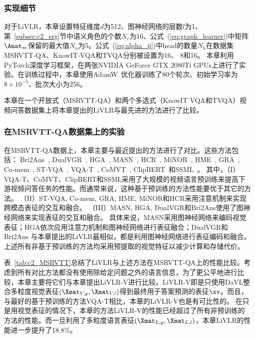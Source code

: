 \subsubsection{实现细节}
对于LiVLR，本章设置特征维度$d$为512、图神经网络的层数$l$为1、第~\ref{subsec:c2_srg}节中语义角色的个数$N_r$为16、公式~(\ref{eq:graph_learner})中矩阵$\Amat_{se}$保留的最大值$N_n$为5。公式~(\ref{eq:alpha_ij})中head的数量$N_h$在数据集MSRVTT-QA、KnowIT-VQA和TVQA分别被设置为16、 8和16。
本章利用PyTorch深度学习框架，在两张NVIDIA GeForce GTX 2080Ti GPUs上进行了实验。在训练过程中，本章使用AdamW~\cite{loshchilov2017decoupled}优化器训练了80个轮次、初始学习率为$8\times 10^{-5}$、批次大小为256。

 

本章在一个开放式（MSRVTT-QA）和两个多选式（KnowIT VQA和TVQA）视频问答数据集上将本章提出的LiVLR与最先进的方法进行了比较。


\subsubsection{在MSRVTT-QA数据集上的实验}
在MSRVTT-QA数据上，本章主要与最近提出的方法进行了对比。这些方法包括：
Bri2Ans~\cite{park2021bridge}, DualVGR~\cite{wang2021dualvgr}, HGA~\cite{jiang2020reasoning}, MASN~\cite{seo2021attend}, HCR~\cite{le2020hierarchical}, MiNOR~\cite{jin2019multi}, HME~\cite{fan2019heterogeneous}, GRA~\cite{xu2017video}, Co-mem~\cite{gao2018motion}, ST-VQA~\cite{jang2017tgif}, VQA-T~\cite{yang2021just}, CoMVT~\cite{seo2021look}, ClipBERT~\cite{lei2021less}和SSML~\cite{amrani2021noise}。
其中，（I）VQA-T、CoMVT、ClipBERT和SSML采用了大规模的视频语言预训练来提高下游视频问答任务的性能。而通常来说，这种基于预训练的方法性能要优于其它的方法。
（II）ST-VQA, Co-mem, GRA, HME, MiNOR和HCR采用注意机制来实现跨模态表征的交互和融合。
（III）MASN, HGA, DualVGR和Bri2Ans使用了图神经网络来实现表征的交互和融合。
具体来说，MASN采用图神经网络来编码视觉表征；HGA依次应用注意力机制和图神经网络进行表征融合；DualVGR和Bri2Ans 与本章提出的LiVLR最相似，都是利用图神经网络进行表征编码和融合。
上述所有非基于预训练的方法均采用预提取的视觉特征以减少计算和存储代价。


表~\ref{tab:c2_MSRVTT}总结了LiVLR与上述方法在MSRVTT-QA上的性能比较。考虑到所有对比方法都没有使用除给定问题之外的语言信息，为了更公平地进行比较，本章主要将它们与本章提出LiVLR-V进行比较。LiVLR-V即是只使用DaVL整合多粒度视觉表征$(\Xmat_{V, g}, \Xmat_{V, l})$得到最终用于答案预测的表征$\hat{\xv}$。而且，与最好的基于预训练的方法VQA-T相比，本章的LiVLR-V也是有可比性的。
在只是用视觉表征的情况下，本章的方法LiVLR-V的性能已经超过了所有非预训练的方法的性能。而一旦利用了多粒度语言表征$(\Xmat_{L, g}, \Xmat_{L, l})$，本章LiVLR的性能进一步提升了18.8\%。




